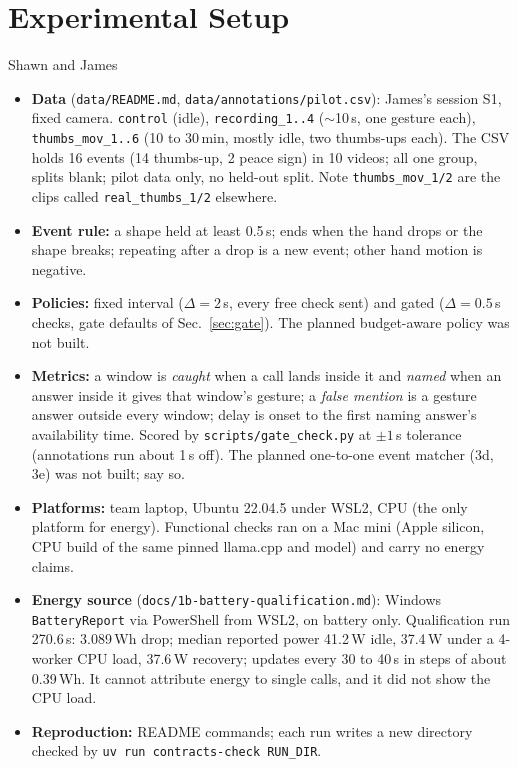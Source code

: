 \section{Experimental Setup}
\label{sec:setup}
\begin{notes}{Shawn and James}
\begin{itemize}\setlength\itemsep{0pt}
\item \textbf{Data} (\texttt{data/README.md}, \texttt{data/annotations/pilot.csv}): James's session S1, fixed camera. \texttt{control} (idle), \texttt{recording\_1..4} ($\sim$10\,s, one gesture each), \texttt{thumbs\_mov\_1..6} (10 to 30\,min, mostly idle, two thumbs-ups each). The CSV holds 16 events (14 thumbs-up, 2 peace sign) in 10 videos; all one group, splits blank; pilot data only, no held-out split. Note \texttt{thumbs\_mov\_1/2} are the clips called \texttt{real\_thumbs\_1/2} elsewhere.
\item \textbf{Event rule:} a shape held at least 0.5\,s; ends when the hand drops or the shape breaks; repeating after a drop is a new event; other hand motion is negative.
\item \textbf{Policies:} fixed interval ($\Delta=2$\,s, every free check sent) and gated ($\Delta=0.5$\,s checks, gate defaults of Sec.~\ref{sec:gate}). The planned budget-aware policy was not built.
\item \textbf{Metrics:} a window is \emph{caught} when a call lands inside it and \emph{named} when an answer inside it gives that window's gesture; a \emph{false mention} is a gesture answer outside every window; delay is onset to the first naming answer's availability time. Scored by \texttt{scripts/gate\_check.py} at $\pm1$\,s tolerance (annotations run about 1\,s off). The planned one-to-one event matcher (3d, 3e) was not built; say so.
\item \textbf{Platforms:} team laptop, Ubuntu 22.04.5 under WSL2, CPU (the only platform for energy). Functional checks ran on a Mac mini (Apple silicon, CPU build of the same pinned llama.cpp and model) and carry no energy claims.
\item \textbf{Energy source} (\texttt{docs/1b-battery-qualification.md}): Windows \texttt{BatteryReport} via PowerShell from WSL2, on battery only. Qualification run 270.6\,s: 3.089\,Wh drop; median reported power 41.2\,W idle, 37.4\,W under a 4-worker CPU load, 37.6\,W recovery; updates every 30 to 40\,s in steps of about 0.39\,Wh. It cannot attribute energy to single calls, and it did not show the CPU load.
\item \textbf{Reproduction:} README commands; each run writes a new directory checked by \texttt{uv run contracts-check RUN\_DIR}.
\end{itemize}
\end{notes}
